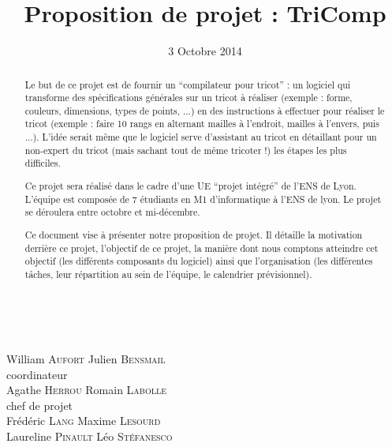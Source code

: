 \documentclass{article}
\title{Proposition de projet : TriComp}
\author{}
\date{3 Octobre 2014}
\begin{document}
\makeatletter %
  \begin{titlepage}
    \begin{center}
       {\LARGE \@title} \\
       \vspace{2cm}
       {\large \@date}
       \vspace{3cm}
    \end{center}
       {\large
       {William \textsc{Aufort} \hfill Julien \textsc{Bensmail} \\}
    \vspace{1cm}
       {\hfill coordinateur \\}
       {Agathe \textsc{Herrou}  \hfill Romain \textsc{Labolle} \\}
       \vspace{1cm}
       {chef de projet \\}
       \vspace{1.5cm}
       {Frédéric \textsc{Lang} \hfill Maxime \textsc{Lesourd} \\}
       {Laureline \textsc{Pinault} \hfill Léo \textsc{Stéfanesco} \\}}
       \vspace{2.5cm}
       \begin{abstract}
  Le but de ce projet est de fournir un ``compilateur pour tricot'' : un logiciel qui transforme des spécifications générales sur un tricot à réaliser (exemple : forme, couleurs, dimensions, types de points, ...) en des instructions à effectuer pour réaliser le tricot (exemple : faire 10 rangs en alternant mailles à l'endroit, mailles à l'envers, puis ...). L'idée serait même que le logiciel serve d'assistant au tricot en détaillant pour un non-expert du tricot (mais sachant tout de même tricoter !) les étapes les plus difficiles.

  Ce projet sera réalisé dans le cadre d'une UE ``projet intégré'' de l'ENS de Lyon. L'équipe est composée de 7 étudiants en M1 d'informatique à l'ENS de lyon. Le projet se déroulera entre octobre et mi-décembre.

  Ce document vise à présenter notre proposition de projet. Il détaille la motivation derrière ce projet, l'objectif de ce projet, la manière dont nous comptons atteindre cet objectif (les différents composants du logiciel) ainsi que l'organisation (les différentes tâches, leur répartition au sein de l'équipe, le calendrier prévisionnel).
      \end{abstract}
  \end{titlepage}
\makeatother
\end{document}
